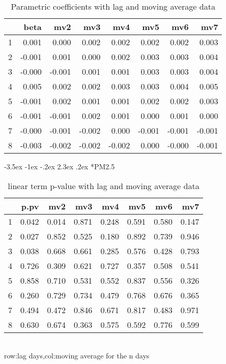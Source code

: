 \documentclass[a4paper, 12pt]{article}
\makeatletter
\def\large{\fontsize{14}{20}\selectfont}
\renewcommand\subsection{\@startsection {subsection}{1}{\z@}%
                                   {-3.5ex \@plus -1ex \@minus -.2ex}%
                                   {2.3ex \@plus.2ex}%
                                   {\centering\normalfont\large\bfseries}}
\makeatother
\begin{document}
\begin{table}[h]
\centering
\caption{Parametric coefficients with lag and moving average data}
\begin{tabular}{rrrrrrrr}
  \hline
 & beta & mv2 & mv3 & mv4 & mv5 & mv6 & mv7 \\
  \hline
1 & 0.001 & 0.000 & 0.002 & 0.002 & 0.002 & 0.002 & 0.003 \\
  2 & -0.001 & 0.001 & 0.000 & 0.002 & 0.003 & 0.003 & 0.004 \\
  3 & -0.000 & -0.001 & 0.001 & 0.001 & 0.003 & 0.003 & 0.004 \\
  4 & 0.005 & 0.002 & 0.002 & 0.003 & 0.003 & 0.004 & 0.005 \\
  5 & -0.001 & 0.002 & 0.001 & 0.001 & 0.002 & 0.002 & 0.003 \\
  6 & -0.001 & -0.001 & 0.002 & 0.001 & 0.000 & 0.001 & 0.000 \\
  7 & -0.000 & -0.001 & -0.002 & 0.000 & -0.001 & -0.001 & -0.001 \\
  8 & -0.003 & -0.002 & -0.002 & -0.002 & 0.000 & -0.000 & -0.001 \\
   \hline
\end{tabular}
\end{table}
\clearpage
\subsection*{PM2.5}
\begin{table}[h]
\centering
\caption{linear term p-value with lag and moving average data}
\begin{tabular}{rrrrrrrr}
  \hline
 & p.pv & mv2 & mv3 & mv4 & mv5 & mv6 & mv7 \\
  \hline
1 & 0.042 & 0.014 & 0.871 & 0.248 & 0.591 & 0.580 & 0.147 \\
  2 & 0.027 & 0.852 & 0.525 & 0.180 & 0.892 & 0.739 & 0.946 \\
  3 & 0.038 & 0.668 & 0.661 & 0.285 & 0.576 & 0.428 & 0.793 \\
  4 & 0.726 & 0.309 & 0.621 & 0.727 & 0.357 & 0.508 & 0.541 \\
  5 & 0.858 & 0.710 & 0.531 & 0.552 & 0.837 & 0.556 & 0.326 \\
  6 & 0.260 & 0.729 & 0.734 & 0.479 & 0.768 & 0.676 & 0.365 \\
  7 & 0.494 & 0.472 & 0.846 & 0.671 & 0.817 & 0.483 & 0.971 \\
  8 & 0.630 & 0.674 & 0.363 & 0.575 & 0.592 & 0.776 & 0.599 \\
   \hline
\end{tabular}
\\row:lag days,col:moving average for the n days
\end{table}
\end{document}
